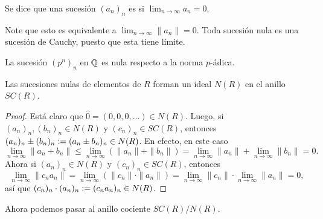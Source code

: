 \documentclass{article}
\numberwithin{equation}{section}
\theoremstyle{definition}
\begin{document}
\begin{definicion}
  Se dice que una sucesión $(a_n)_n$ es  si
  $\lim_{n\to\infty} a_n = 0$.
\end{definicion}

Note que esto es equivalente a $\lim_{n\to\infty} \|a_n\| = 0$. Toda sucesión
nula es una sucesión de Cauchy, puesto que esta tiene límite.

\begin{ejemplo}
  La sucesión $(p^n)_n$ en $\mathbb{Q}$ es nula respecto a la norma $p$-ádica.
\end{ejemplo}

\begin{lema}
  Las sucesiones nulas de elementos de $R$ forman un ideal $N (R)$ en el anillo
  $SC (R)$.

  \begin{proof}
    Está claro que $\widehat{0} = (0,0,0,\ldots) \in N (R)$. Luego, si
    $(a_n)_n, (b_n)_n \in N (R)$ y $(c_n)_n \in SC (R)$, entonces
    $(a_n)_n \pm (b_n)_n \mathrel{\mathop:}= (a_n\pm b_n)_n \in N (R)$. En efecto, en este caso
    \[ \lim_{n\to\infty} \|a_n + b_n\| \le
       \lim_{n\to\infty} (\|a_n\| + \|b_n\|) =
       \lim_{n\to\infty} \|a_n\| + \lim_{n\to\infty} \|b_n\| = 0. \]
    Ahora si $(a_n)_n\in N (R)$ y $(c_n)_n\in SC (R)$, entonces
    \[ \lim_{n\to\infty} \|c_n a_n\| =
       \lim_{n\to\infty} (\|c_n\|\cdot \|a_n\|) =
       \lim_{n\to\infty} \|c_n\| \cdot \lim_{n\to\infty} \|a_n\| = 0, \]
    así que $(c_n)_n\cdot (a_n)_n \mathrel{\mathop:}= (c_n a_n)_n \in N (R)$.
  \end{proof}
\end{lema}

Ahora podemos pasar al anillo cociente $SC(R)/N(R)$.
\end{document}
